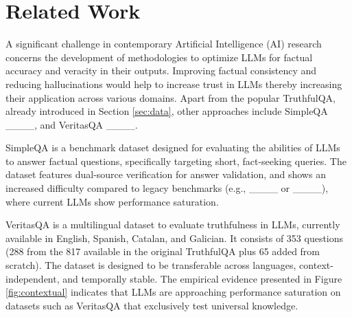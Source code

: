 \section{Related Work}
\label{sec:related_work}

A significant challenge in contemporary Artificial Intelligence (AI) research concerns the development of methodologies to optimize LLMs for factual accuracy and veracity in their outputs. %
Improving factual consistency and reducing hallucinations would help to increase trust in LLMs thereby increasing their application across various domains. Apart from the popular TruthfulQA, already introduced in Section \ref{sec:data}, other approaches include SimpleQA ____,
and VeritasQA ____.

SimpleQA is a benchmark dataset designed for evaluating the abilities of LLMs to answer factual questions, specifically targeting short, fact-seeking queries. The dataset %
features dual-source verification for answer validation, %
and shows an increased difficulty compared to legacy benchmarks (e.g., ____ or ____), where current LLMs show performance saturation. 

VeritasQA is a multilingual dataset to evaluate truthfulness in LLMs, currently available in English, Spanish, Catalan, and Galician. It consists of 353 questions (288 from the 817 available in the original TruthfulQA plus 65 added from scratch). The dataset is designed to be transferable across languages, context-independent, and temporally stable. The empirical evidence presented in Figure \ref{fig:contextual} indicates that LLMs are approaching performance saturation on datasets such as VeritasQA that exclusively test universal knowledge. %